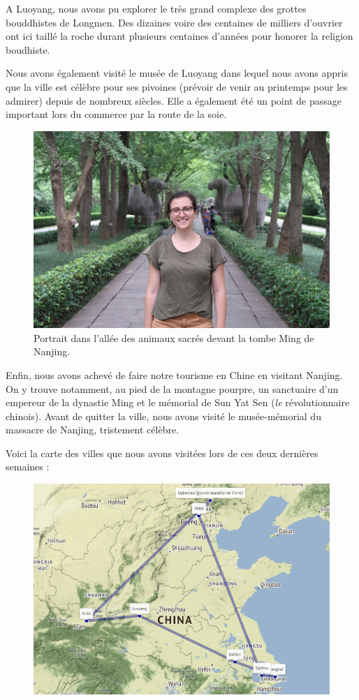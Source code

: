 A Luoyang, nous avons pu explorer le très grand complexe des grottes
bouddhistes de Longmen. Des dizaines voire des centaines de milliers
d'ouvrier ont ici taillé la roche durant plusieurs centaines d'années
pour honorer la religion boudhiste.

Nous avons également visité le musée de Luoyang dans lequel nous avons
appris que la ville est célèbre pour ses pivoines (prévoir de venir au
printemps pour les admirer) depuis de nombreux siècles. Elle a également
été un point de passage important lors du commerce par la route de la
soie.

\begin{figure}
\centering
\includegraphics{images/20180622_nanjing.JPG}
\caption{Portrait dans l'allée des animaux sacrés devant la tombe Ming
de Nanjing.}
\end{figure}

Enfin, nous avons achevé de faire notre tourisme en Chine en visitant
Nanjing. On y trouve notamment, au pied de la montagne pourpre, un
sanctuaire d'un empereur de la dynastie Ming et le mémorial de Sun Yat
Sen (\emph{le} révolutionnaire chinois). Avant de quitter la ville, nous
avons visité le musée-mémorial du massacre de Nanjing, tristement
célèbre.

Voici la carte des villes que nous avons visitées lors de ces deux
dernières semaines :

\begin{figure}
\centering
\includegraphics{maps/Chine.png}
\end{figure}

